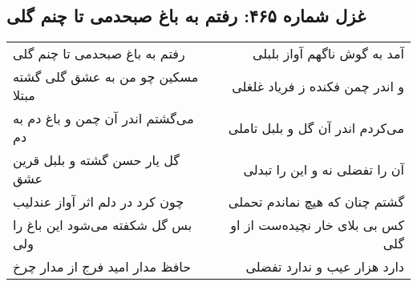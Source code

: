\begin{center}
\section*{غزل شماره ۴۶۵: رفتم به باغ صبحدمی تا چنم گلی}
\label{sec:sh465}
\begin{longtable}{l p{0.5cm} r}
رفتم به باغ صبحدمی تا چنم گلی
&&
آمد به گوش ناگهم آواز بلبلی
\\
مسکین چو من به عشق گلی گشته مبتلا
&&
و اندر چمن فکنده ز فریاد غلغلی
\\
می‌گشتم اندر آن چمن و باغ دم به دم
&&
می‌کردم اندر آن گل و بلبل تاملی
\\
گل یار حسن گشته و بلبل قرین عشق
&&
آن را تفضلی نه و این را تبدلی
\\
چون کرد در دلم اثر آواز عندلیب
&&
گشتم چنان که هیچ نماندم تحملی
\\
بس گل شکفته می‌شود این باغ را ولی
&&
کس بی بلای خار نچیده‌ست از او گلی
\\
حافظ مدار امید فرج از مدار چرخ
&&
دارد هزار عیب و ندارد تفضلی
\\
\end{longtable}
\end{center}
